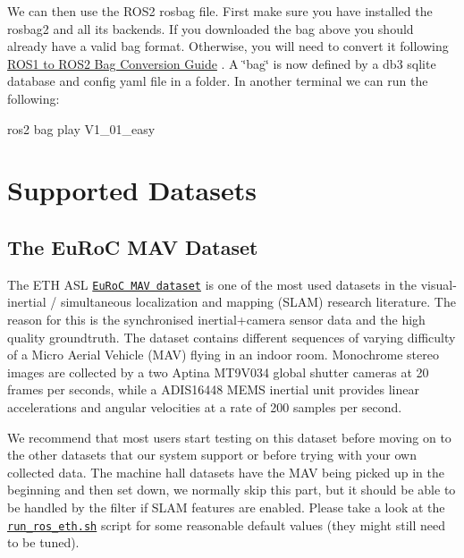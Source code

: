 We can then use the R\+O\+S2 rosbag file. First make sure you have installed the rosbag2 and all its backends. If you downloaded the bag above you should already have a valid bag format. Otherwise, you will need to convert it following \hyperlink{dev-ros1-to-ros2}{R\+O\+S1 to R\+O\+S2 Bag Conversion Guide} . A \char`\"{}bag\char`\"{} is now defined by a db3 sqlite database and config yaml file in a folder. In another terminal we can run the following\+:


\begin{DoxyCode}
ros2 bag play V1\_01\_easy
\end{DoxyCode}
 \hypertarget{gs-datasets}{}\section{Supported Datasets}\label{gs-datasets}
\hypertarget{gs-datasets_gs-data-euroc}{}\subsection{The Eu\+Ro\+C M\+A\+V Dataset}\label{gs-datasets_gs-data-euroc}
The E\+TH A\+SL \href{https://projects.asl.ethz.ch/datasets/doku.php?id=kmavvisualinertialdatasets}{\tt Eu\+RoC M\+AV dataset} \cite{Burri2016IJRR} is one of the most used datasets in the visual-\/inertial / simultaneous localization and mapping (S\+L\+AM) research literature. The reason for this is the synchronised inertial+camera sensor data and the high quality groundtruth. The dataset contains different sequences of varying difficulty of a Micro Aerial Vehicle (M\+AV) flying in an indoor room. Monochrome stereo images are collected by a two Aptina M\+T9\+V034 global shutter cameras at 20 frames per seconds, while a A\+D\+I\+S16448 M\+E\+MS inertial unit provides linear accelerations and angular velocities at a rate of 200 samples per second.

We recommend that most users start testing on this dataset before moving on to the other datasets that our system support or before trying with your own collected data. The machine hall datasets have the M\+AV being picked up in the beginning and then set down, we normally skip this part, but it should be able to be handled by the filter if S\+L\+AM features are enabled. Please take a look at the \href{https://github.com/rpng/open_vins/blob/master/ov_msckf/scripts/run_ros_eth.sh}{\tt run\+\_\+ros\+\_\+eth.\+sh} script for some reasonable default values (they might still need to be tuned).



